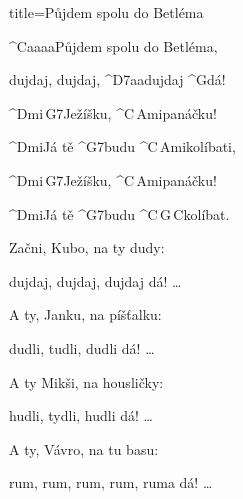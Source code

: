 \begin{song}{title=\predtitle\centering Půjdem spolu do Betléma \\\large   \vspace*{-0.3cm}}  %
\begin{centerjustified}
\nejvetsi

\sloka
	^{C{\color{white}aaaa}}Půjdem spolu do Betléma,

	dujdaj, dujdaj, ^{D7{\color{white}aa}}dujdaj ^{G}dá!

	^{Dmi\,G7}Ježíšku, ^{C\,Ami}panáčku!

	^{Dmi}Já tě ^{G7}budu ^{C\,Ami}kolíbati,

	^{Dmi\,G7}Ježíšku, ^{C\,Ami}panáčku!

	^{Dmi}Já tě ^{G7}budu ^{C\,G\,C}kolíbat.

\sloka
	Začni, Kubo, na ty dudy:

	dujdaj, dujdaj, dujdaj dá! \dots


\sloka
	A ty, Janku, na píšťalku:

	dudli, tudli, dudli dá! \dots


\sloka
	A ty Mikši, na housličky:

	hudli, tydli, hudli dá! \dots


\sloka
	A ty, Vávro, na tu basu:

	rum, rum, rum, rum, ruma dá! \dots


\end{centerjustified}
\setcounter{Slokočet}{0}
\end{song}


